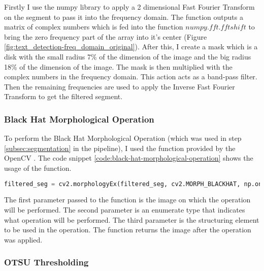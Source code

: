 Firstly I use the numpy library to apply a 2 dimensional Fast Fourier Transform on the segment to pass it into the frequency domain. The function outputs a matrix of complex numbers which is fed into the function $numpy.fft.fftshift$ to bring the zero frequency part of the array into it's center (Figure \ref{fig:text_detection-freq_domain_original}). After this, I create a mask which is a disk with the small radius 7\% of the dimension of the image and the big radius 18\% of the dimension of the image. The mask is then multiplied with the complex numbers in the frequency domain. This action acts as a band-pass filter. Then the remaining frequencies are used to apply the Inverse Fast Fourier Transform to get the filtered segment.

\subsubsection{Black Hat Morphological Operation}

To perform the Black Hat Morphological Operation (which was used in step \ref{subsec:segmentation} in the pipeline), I used the function provided by the OpenCV \cite{site:opencv-morphological-ops}. The code snippet \ref{code:black-hat-morphological-operation} shows the usage of the function.

\begin{lstlisting}[language=Python, label=code:black-hat-morphological-operation, caption={Black Hat Morphological Operation}]
    filtered_seg = cv2.morphologyEx(filtered_seg, cv2.MORPH_BLACKHAT, np.ones((3,3), np.uint8))
\end{lstlisting}

The first parameter passed to the function is the image on which the operation will be performed. The second parameter is an enumerate type that indicates what operation will be performed. The third parameter is the structuring element to be used in the operation. The function returns the image after the operation was applied.

\subsubsection{OTSU Thresholding}

